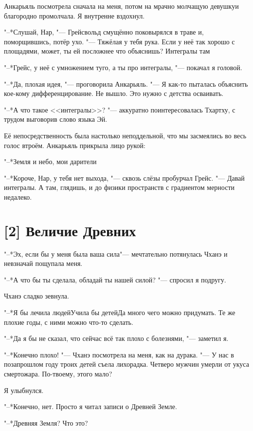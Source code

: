 Анкарьяль посмотрела сначала на меня, потом на мрачно молчащую девушку\ldotst и благородно промолчала.
Я внутренне вздохнул.

"--*Слушай, Нар, "--- Грейсвольд смущённо поковырялся в траве и, поморщившись, потёр ухо.
"--- Тяжёлая у тебя рука.
Если у неё так хорошо с площадями, может, ты ей посложнее что объяснишь?
Интегралы там\ldotst

"--*Грейс, у неё с умножением туго, а ты про интегралы, "--- покачал я головой.

"--*Да, плохая идея, "--- проговорила Анкарьяль.
"--- Я как-то пыталась объяснить кое-кому дифференцирование.
Не вышло.
Это нужно с детства осваивать.

"--*А что такое <<интегралы>>? "--- аккуратно поинтересовалась Тхартху, с трудом выговорив слово языка Эй.

Её непосредственность была настолько неподдельной, что мы засмеялись во весь голос втроём.
Анкарьяль прикрыла лицо рукой:

"--*Земля и небо, мои дарители\ldotst

"--*Короче, Нар, у тебя нет выхода, "--- сквозь слёзы пробурчал Грейс.
"--- Давай интегралы.
А там, глядишь, и до физики пространств с градиентом мерности недалеко.

\section{[2] Величие Древних}

"--*Эх, если бы у меня была ваша сила\ldotst "--- мечтательно потянулась Чханэ и невзначай пощупала меня.

"--*А что бы ты сделала, обладай ты нашей силой? "--- спросил я подругу.

Чханэ сладко зевнула.

"--*Я бы лечила людей\ldotst Учила бы детей\ldotst Да много чего можно придумать.
Те же плохие годы, с ними можно что-то сделать.

"--*Да я бы не сказал, что сейчас всё так плохо с болезнями, "--- заметил я.

"--*Конечно плохо! "--- Чханэ посмотрела на меня, как на дурака.
"--- У нас в позапрошлом году троих детей съела лихорадка.
Четверо мужчин умерли от укуса смертожара.
По-твоему, этого мало?

Я улыбнулся.

"--*Конечно, нет.
Просто я читал записи о Древней Земле.

"--*Древняя Земля?
Что это?

